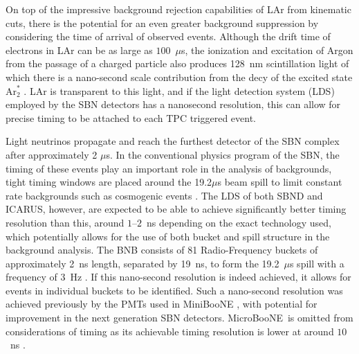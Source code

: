 \documentclass[11pt, a4paper]{article}
\def\muboone{MicroBooNE}
\begin{document}
On top of the impressive background rejection capabilities of LAr from
kinematic cuts, there is the potential for an even greater background 
suppression by considering the time of arrival of observed events. Although the 
drift time of electrons in LAr can be as large as $100$~$\mu$s, the ionization
and excitation of Argon from the passage of a charged particle also produces
128~nm scintillation light of which there is a nano-second scale contribution
from the decy of the excited state $\text{Ar}^*_2$ \cite{Acciarri:2015hha}. LAr is
transparent to this light, and if the light detection system (LDS) employed by
the SBN detectors has a nanosecond resolution, this can allow for
precise timing to be attached to each TPC triggered event.

Light neutrinos propagate and reach the furthest detector of the SBN complex
after approximately 2 $\mu$s. In the conventional physics program of the SBN,
the timing of these events play an important role in the analysis of
backgrounds, tight timing windows are placed around the 19.2$\mu$s beam spill
to limit constant rate backgrounds such as cosmogenic events
\cite{Antonello:2015lea}. The LDS of both SBND and ICARUS, however, are
expected to be able to achieve significantly better timing resolution than
this, around $1$--$2$~ns depending on the exact technology used, which
potentially allows for the use of both bucket and spill structure in the
background analysis. The BNB consists of 81 Radio-Frequency buckets of
approximately 2~ns length, separated by 19~ns, to form the 19.2~$\mu$s spill
with a frequency of 3~Hz \cite{Antonello:2015lea}.  If this nano-second
resolution is indeed achieved, it allows for events in individual buckets to be
identified.  Such a nano-second resolution was achieved previously by the PMTs
used in MiniBooNE \cite{Antonello:2015lea}, with potential for improvement in
the next generation SBN detectors. \muboone\ is omitted from considerations of
timing as its achievable timing resolution is lower at around $10$~ns
\cite{Katori:2013wqa}.
\end{document}
